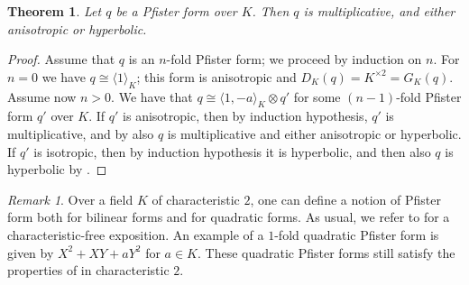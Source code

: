 \documentclass[12pt, leqno, british]{amsart}
\theoremstyle{definition}
\theoremstyle{plain}
\newtheorem{thm}[defi]{Theorem}
\theoremstyle{remark}
\newtheorem{rem}[defi]{Remark}
\begin{document}
\begin{thm}\label{T:Pfister-forms}
Let $q$ be a Pfister form over $K$.
Then $q$ is multiplicative, and either anisotropic or hyperbolic.
\end{thm}
\begin{proof}
Assume that $q$ is an $n$-fold Pfister form; we proceed by induction on $n$.
For $n = 0$ we have $q \cong \langle 1 \rangle_K$; this form is anisotropic and $D_K(q) = K^{\times 2} = G_K(q)$.
Assume now $n > 0$.
We have that $q \cong \langle 1, -a \rangle_K \otimes q'$ for some $(n-1)$-fold Pfister form $q'$ over $K$.
If $q'$ is anisotropic, then by induction hypothesis, $q'$ is multiplicative, and by  also $q$ is multiplicative and either anisotropic or hyperbolic.
If $q'$ is isotropic, then by induction hypothesis it is hyperbolic, and then also $q$ is hyperbolic by .
\end{proof}
\begin{rem}
Over a field $K$ of characteristic $2$, one can define a notion of Pfister form both for bilinear forms and for quadratic forms.
As usual, we refer to \autocite[Sections 7, 9]{ElmanKarpenkoMerkurjev} for a characteristic-free exposition.
An example of a $1$-fold quadratic Pfister form is given by $X^2 + XY + aY^2$ for $a \in K$.
These quadratic Pfister forms still satisfy the properties of  in characteristic $2$.
\end{rem}
\end{document}
